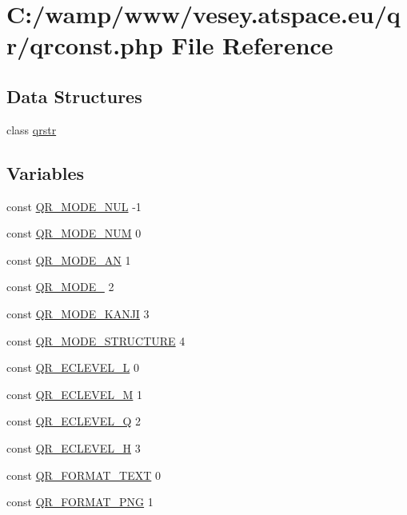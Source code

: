 \hypertarget{qrconst_8php}{\section{C\-:/wamp/www/vesey.atspace.\-eu/qr/qrconst.php File Reference}
\label{qrconst_8php}
}
\subsection*{Data Structures}
\begin{DoxyCompactItemize}
\item 
class \hyperlink{classqrstr}{qrstr}
\end{DoxyCompactItemize}
\subsection*{Variables}
\begin{DoxyCompactItemize}
\item 
const \hyperlink{qrconst_8php_a24d6b51d9ddaaefd084528b779b16ffb}{Q\-R\-\_\-\-M\-O\-D\-E\-\_\-\-N\-U\-L} -\/1
\item 
const \hyperlink{qrconst_8php_abc8d5a6a5d9977177af9aced52703323}{Q\-R\-\_\-\-M\-O\-D\-E\-\_\-\-N\-U\-M} 0
\item 
const \hyperlink{qrconst_8php_a3525e0bd3a1dadffcdb3f1b9a973db8f}{Q\-R\-\_\-\-M\-O\-D\-E\-\_\-\-A\-N} 1
\item 
const \hyperlink{qrconst_8php_aa3452182528d53c7b65c6802ad15b772}{Q\-R\-\_\-\-M\-O\-D\-E\-\_} 2
\item 
const \hyperlink{qrconst_8php_a2b9cfae389f30855ddfa68fef6ffb5ee}{Q\-R\-\_\-\-M\-O\-D\-E\-\_\-\-K\-A\-N\-J\-I} 3
\item 
const \hyperlink{qrconst_8php_ab9c56e5432a5c63b792802d26cff5d9b}{Q\-R\-\_\-\-M\-O\-D\-E\-\_\-\-S\-T\-R\-U\-C\-T\-U\-R\-E} 4
\item 
const \hyperlink{qrconst_8php_ae106d3baebd9c27c90b2abadb25df012}{Q\-R\-\_\-\-E\-C\-L\-E\-V\-E\-L\-\_\-\-L} 0
\item 
const \hyperlink{qrconst_8php_afa670ea7afad29461222face71c5ba1e}{Q\-R\-\_\-\-E\-C\-L\-E\-V\-E\-L\-\_\-\-M} 1
\item 
const \hyperlink{qrconst_8php_ab8794177ecfd3ccdc8a1677ea3e32bbe}{Q\-R\-\_\-\-E\-C\-L\-E\-V\-E\-L\-\_\-\-Q} 2
\item 
const \hyperlink{qrconst_8php_a6c2b8366b7a5336d61db447be8884044}{Q\-R\-\_\-\-E\-C\-L\-E\-V\-E\-L\-\_\-\-H} 3
\item 
const \hyperlink{qrconst_8php_a31802a9747faed0854c3740a9065df0f}{Q\-R\-\_\-\-F\-O\-R\-M\-A\-T\-\_\-\-T\-E\-X\-T} 0
\item 
const \hyperlink{qrconst_8php_ac0680a77cbb0fb197076f71573e47868}{Q\-R\-\_\-\-F\-O\-R\-M\-A\-T\-\_\-\-P\-N\-G} 1
\end{DoxyCompactItemize}



